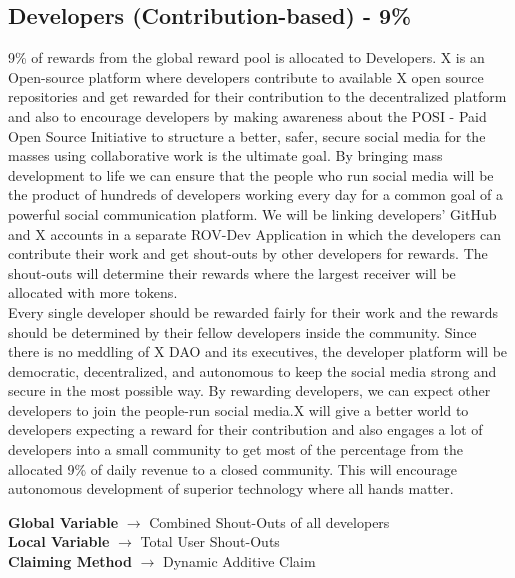 \documentclass[letterpaper,11pt]{article}
\begin{document}
\subsection{\textbf{Developers (Contribution-based) - 9\%}}

9\% of rewards from the global reward pool is allocated to Developers. X is an Open-source platform where developers contribute to available X open source repositories and get rewarded for their contribution to the decentralized platform and also to encourage developers by making awareness about the POSI - Paid Open Source Initiative to structure a better, safer, secure social media for the masses using collaborative work is the ultimate goal. By bringing mass development to life we can ensure that the people who run social media will be the product of hundreds of developers working every day for a common goal of a powerful social communication platform. We will be linking developers' GitHub and X accounts in a separate ROV-Dev Application in which the developers can contribute their work and get shout-outs by other developers for rewards. The shout-outs will determine their rewards where the largest receiver will be allocated with more tokens.\\ 

Every single developer should be rewarded fairly for their work and the rewards should be determined by their fellow developers inside the community. Since there is no meddling of X DAO and its executives, the developer platform will be democratic, decentralized, and autonomous to keep the social media strong and secure in the most possible way. By rewarding developers, we can expect other developers to join the people-run social media.X will give a better world to developers expecting a reward for their contribution and also engages a lot of developers into a small community to get most of the percentage from the allocated 9\% of daily revenue to a closed community. This will encourage autonomous development of superior technology where all hands matter. \\


\begin{center}
\textbf{Global Variable} $\to$ Combined Shout-Outs of all developers\\
\vspace{2mm}
\textbf{Local Variable} $\to$ Total User Shout-Outs\\
\vspace{2mm}
\textbf{Claiming Method} $\to$ Dynamic Additive Claim\\
\end{center}
\end{document}
